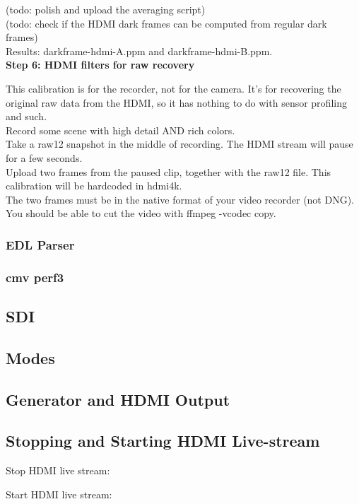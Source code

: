 (todo: polish and upload the averaging script)\\

(todo: check if the HDMI dark frames can be computed from regular dark frames)\\

Results: darkframe-hdmi-A.ppm and darkframe-hdmi-B.ppm.\\

\textbf{Step 6: HDMI filters for raw recovery }

This calibration is for the recorder, not for the camera. It's for recovering the original raw data from the HDMI, so it has nothing to do with sensor profiling and such.\\

Record some scene with high detail AND rich colors.\\

Take a raw12 snapshot in the middle of recording. The HDMI stream will pause for a few seconds.\\

Upload two frames from the paused clip, together with the raw12 file. This calibration will be hardcoded in hdmi4k.\\

The two frames must be in the native format of your video recorder (not DNG). You should be able to cut the video with ffmpeg -vcodec copy. 

	
\subsubsection{EDL Parser}
\subsubsection{cmv perf3}
\subsection{SDI}
\subsection{Modes}



\subsection{Generator and HDMI Output}
\subsection{Stopping and Starting HDMI Live-stream}

Stop HDMI live stream: 


Start HDMI live stream: 

